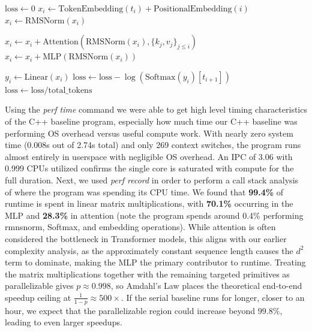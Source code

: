 \begin{algorithm}[H]
\caption{High-Level Forward Pass}
\label{alg:forward-pass}
\begin{algorithmic}
\State $\text{loss} \gets 0$
        \State $x_i \gets \text{TokenEmbedding}(t_i) + \text{PositionalEmbedding}(i)$
        \State $x_i \gets \text{RMSNorm}(x_i)$

            \State $x_i \gets x_i + \text{Attention}(\text{RMSNorm}(x_i), \{k_j, v_j\}_{j \le i})$
            \State $x_i \gets x_i + \text{MLP}(\text{RMSNorm}(x_i))$
        \EndFor

        \State $y_i \gets \text{Linear}(x_i)$
        \State $\text{loss} \gets \text{loss} - \log(\text{Softmax}(y_i)[t_{i+1}])$
    \EndFor
\EndFor
\State $\text{loss} \gets \text{loss} / \text{total\_tokens}$
\end{algorithmic}
\end{algorithm}

Using the \textit{perf time} command we were able to get high level timing characteristics of the C++ baseline program, especially how much time our C++ baseline was performing OS overhead versus useful compute work. With nearly zero system time (0.008s out of 2.74s total) and only 269 context switches, the program runs almost entirely in userspace with negligible OS overhead. An IPC of 3.06 with 0.999 CPUs utilized confirms the single core is saturated with compute for the full duration. Next, we used \textit{perf record} in order to perform a call stack analysis of where the program was spending its CPU time. 
We found that \textbf{99.4\%} of runtime is spent in linear matrix multiplications, with \textbf{70.1\%} occurring in the MLP and \textbf{28.3\%} in attention (note the program spends around 0.4\% performing rmnsnorm, Softmax, and embedding operations). While attention is often considered the bottleneck in Transformer models, this aligns with our earlier complexity analysis, as the approximately constant sequence length causes the $d^2$ term to dominate, making the MLP the primary contributor to runtime.
Treating the matrix multiplications together with the remaining targeted primitives as parallelizable gives $p \approx 0.998$, so Amdahl's Law places the theoretical end-to-end speedup ceiling at $\frac{1}{1-p} \approx 500\times$. If the serial baseline runs for longer, closer to an hour, we expect that the parallelizable region could increase beyond $99.8\%$, leading to even larger speedups.
